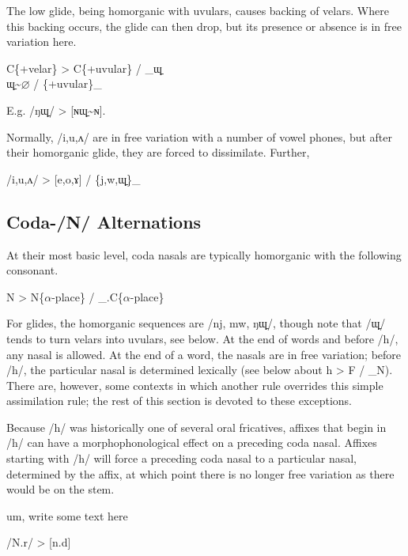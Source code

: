\documentclass[12pt]{book} %
\begin{document}
The low glide, being homorganic with uvulars, causes backing of velars.
Where this backing occurs, the glide can then drop, but its presence or absence is in free variation here.
\begin{center}
    C\{+velar\} > C\{+uvular\} / \_ɰ̠ \\

    ɰ̠\textasciitilde{}$\varnothing$ / \{+uvular\}\_
\end{center}
E.g. /ŋɰ̠/ > [ɴɰ̠\textasciitilde{}ɴ].

Normally, /i,u,ʌ/ are in free variation with a number of vowel phones, but after their homorganic glide, they are forced to dissimilate.
Further, 
\begin{center}
    /i,u,ʌ/ > [e,o,ɤ] / \{j,w,ɰ̠\}\_
\end{center}

\subsection{Coda-/N/ Alternations}

At their most basic level, coda nasals are typically homorganic with the following consonant.
\begin{center}
    N > N\{$\alpha$-place\} / \_.C\{$\alpha$-place\}
\end{center}
For glides, the homorganic sequences are /nj, mw, ŋɰ̠/, though note that /ɰ̠/ tends to turn velars into uvulars, {\color{orange}see below}.
At the end of words and before /h/, any nasal is allowed.
At the end of a word, the nasals are in free variation; {\color{red}before /h/, the particular nasal is determined lexically (see below about h > F / \_N)}.
There are, however, some contexts in which another rule overrides this simple assimilation rule; the rest of this section is devoted to these exceptions.

Because /h/ was historically one of several oral fricatives, affixes that begin in /h/ can have a morphophonological effect on a preceding coda nasal.
Affixes starting with /h/ will force a preceding coda nasal to a particular nasal, determined by the affix, at which point there is no longer free variation as there would be on the stem.

{\color{cyan}
um, write some text here
\begin{center}
    /N.r/ > [n.d] \\
\end{center}
}
\end{document}
